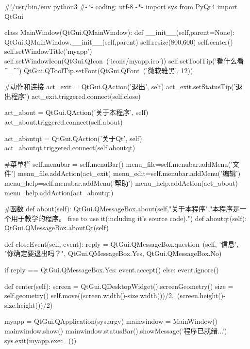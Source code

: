 \documentclass[12pt,oneside]{book}
\begin{document}
\begin{common-format}
\begin{tcbpython}[]
#!/usr/bin/env python3
#-*- coding: utf-8 -*-
import sys
from PyQt4  import QtGui

class MainWindow(QtGui.QMainWindow):
    def __init__(self,parent=None):
        QtGui.QMainWindow.__init__(self,parent)
        self.resize(800,600)
        self.center()
        self.setWindowTitle('myapp')
        self.setWindowIcon(QtGui.QIcon\
        ('icons/myapp.ico'))
        self.setToolTip('看什么看^_^')
        QtGui.QToolTip.setFont(QtGui.QFont\
        ('微软雅黑', 12))

    #动作和连接
        act_exit = QtGui.QAction('退出', self)
        act_exit.setStatusTip('退出程序')
        act_exit.triggered.connect(self.close)

        act_about = QtGui.QAction('关于本程序', self)
        act_about.triggered.connect(self.about)

        act_aboutqt = QtGui.QAction('关于Qt', self)
        act_aboutqt.triggered.connect(self.aboutqt)

    #菜单栏
        self.menubar = self.menuBar()
        menu_file=self.menubar.addMenu('文件')
        menu_file.addAction(act_exit)
        menu_edit=self.menubar.addMenu('编辑')
        menu_help=self.menubar.addMenu('帮助')
        menu_help.addAction(act_about)
        menu_help.addAction(act_aboutqt)

#函数
    def about(self):
        QtGui.QMessageBox.about(self,"关于本程序","本程序是一个用于教学的程序。
        \n\nFell free to use it\n(including it's source code).")
    def aboutqt(self):
        QtGui.QMessageBox.aboutQt(self)

    def closeEvent(self, event):
        reply = QtGui.QMessageBox.question\
        (self, '信息',
            "你确定要退出吗？",
             QtGui.QMessageBox.Yes,
             QtGui.QMessageBox.No)

        if reply == QtGui.QMessageBox.Yes:
            event.accept()
        else:
            event.ignore()

    def center(self):
        screen = QtGui.QDesktopWidget().screenGeometry()
        size =  self.geometry()
        self.move((screen.width()-size.width())/2,\
         (screen.height()-size.height())/2)

myapp = QtGui.QApplication(sys.argv)
mainwindow = MainWindow()
mainwindow.show()
mainwindow.statusBar().showMessage('程序已就绪...')
sys.exit(myapp.exec_())
\end{tcbpython}


\end{common-format}
\end{document}
